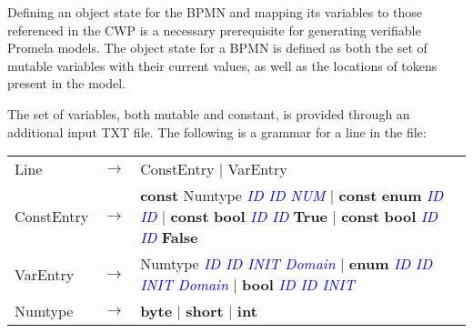 Defining an object state for the BPMN and mapping its variables to those referenced in the CWP is a necessary prerequisite for generating verifiable Promela models. The object state for a BPMN is defined as both the set of mutable variables with their current values, as well as the locations of tokens present in the model.

The set of variables, both mutable and constant, is provided through an additional input TXT file. The following is a grammar for a line in the file:
\begin{comment}

%
{\small
\begin{lstlisting}[style=myTXT]
const byte paymentAmount paymentAmount 253
const byte belowPaymentAmount belowPaymentAmount 252
const byte noRetryPayment noRetryPayment 254
const enum INIT INIT
const enum other other
const enum buyerName buyerName
const enum sellerName sellerName
const enum agreed agreed
const enum failed failed
const byte pendingPayment pendingPayment 255
const enum pending pending
const enum noRetry noRetry

enum terms terms pending [agreed, failed, pending, noRetry]
enum backpackOwner backpackOwner sellerName [buyerName, sellerName]
enum paymentOwner paymentOwner buyerName [sellerName, buyerName]
byte paymentOffered paymentOffered pendingPayment [252-255]
\end{lstlisting}
}
%

\end{comment}

\vspace{1em}
\begin{tabular}{p{5em} p{1em} p{16em}}
        Line   & $\rightarrow$ & ConstEntry | VarEntry \\
        ConstEntry & $\rightarrow$ & \textbf{const} Numtype \textcolor{blue}{\textit{ID ID NUM}} \newline
                    | \textbf{const} \textbf{enum} \textcolor{blue}{\textit{ID ID}} \newline
                    | \textbf{const} \textbf{bool} \textcolor{blue}{\textit{ID ID}} \textbf{True} \newline
                    | \textbf{const} \textbf{bool} \textcolor{blue}{\textit{ID ID}} \textbf{False} \\
        VarEntry  & $\rightarrow$ & Numtype \textcolor{blue}{\textit{ID ID INIT Domain}} \newline
                    | \textbf{enum} \textcolor{blue}{\textit{ID ID INIT Domain}} \newline
                    | \textbf{bool} \textcolor{blue}{\textit{ID ID INIT}} \\
        Numtype   & $\rightarrow$ & \textbf{byte} | \textbf{short} | \textbf{int} \\
\end{tabular}
\vspace{1em}

